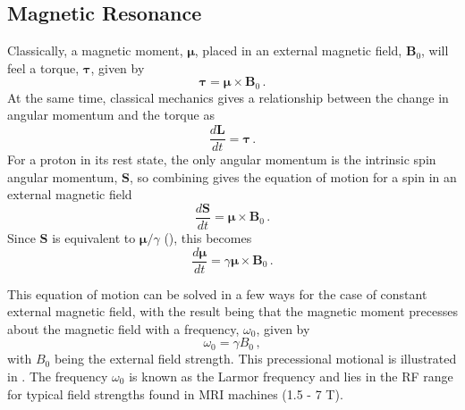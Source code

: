 \subsection{Magnetic Resonance}
\label{sec:bg_resonance}
Classically, a magnetic moment, $\boldsymbol{\mu}$, placed in an external magnetic field, $\mathbf{B}_0$, will feel a torque, $\boldsymbol{\tau}$, given by \cite{Haacke1999} 
\begin{equation}
\label{eq:torque}
\boldsymbol{\tau} = \boldsymbol{\mu} \times \mathbf{B}_0 \,.
\end{equation}
At the same time, classical mechanics gives a relationship between the change in angular momentum and the torque as \cite{Haacke1999} 
\begin{equation}
\label{eq:dLdt}
\frac{d\mathbf{L}}{dt} = \boldsymbol{\tau}\,. 
\end{equation}
For a proton in its rest state, the only angular momentum is the intrinsic spin angular momentum, $\mathbf{S}$, so combining  gives the equation of motion for a spin in an external magnetic field
\begin{equation}
\frac{d\mathbf{S}}{dt} = \boldsymbol{\mu} \times \mathbf{B}_0 \,.
\end{equation}
Since $\mathbf{S}$ is equivalent to $\boldsymbol{\mu}/\gamma$ (), this becomes
\begin{equation}
\frac{d\boldsymbol{\mu}}{dt} = \gamma\boldsymbol{\mu} \times \mathbf{B}_0\,.
\label{eq:dmudt}
\end{equation}

This equation of motion can be solved in a few ways for the case of constant external magnetic field, with the result being that the magnetic moment precesses about the magnetic field with a frequency, $\omega_0$, given by\cite{Levitt2008}
\begin{equation}
\label{eq:LarmorFreq}
\omega_0 = \gamma B_0\,,
\end{equation}
with $B_0$ being the external field strength. 
This precessional motional is illustrated in .
The frequency $\omega_0$ is known as the Larmor frequency and lies in the \ac{RF} range for typical field strengths found in MRI machines (1.5 - 7 T).

